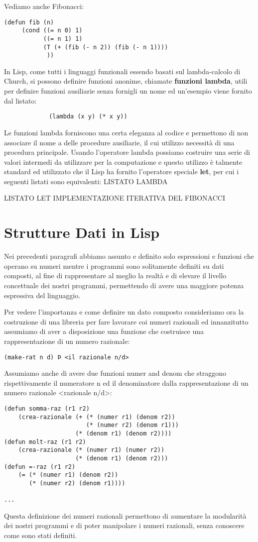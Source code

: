 \documentclass[a4paper]{book}
\begin{document}
Vediamo anche Fibonacci:
\begin{verbatim}
(defun fib (n)
     (cond ((= n 0) 1)
           ((= n 1) 1)
           (T (+ (fib (- n 2)) (fib (- n 1))))
            ))
\end{verbatim}
In Lisp, come tutti i linguaggi funzionali essendo basati sul lambda-calcolo di Church,
si possono definire funzioni anonime, chiamate \textbf{funzioni lambda}, utili per
definire funzioni ausiliarie senza fornigli un nome ed un'esempio viene fornito dal listato:
\begin{figure}
\begin{verbatim}
       (lambda (x y) (* x y))
\end{verbatim}
\end{figure}
Le funzioni lambda forniscono una certa eleganza al codice e permettono di non associare
il nome a delle procedure ausiliarie, il cui utilizzo necessità di una procedura principale.
Usando l'operatore lambda possiamo costruire una serie di valori intermedi da
utilizzare per la computazione e questo utilizzo è talmente standard ed utilizzato
che il Lisp ha fornito l'operatore speciale \textbf{let}, per cui i seguenti listati
sono equivalenti:
LISTATO LAMBDA

LISTATO LET
IMPLEMENTAZIONE ITERATIVA DEL FIBONACCI
\section{Strutture Dati in Lisp}
Nei precedenti paragrafi abbiamo assunto e definito solo espressioni e funzioni che operano su numeri mentre i programmi sono solitamente
definiti su dati composti, al fine di rappresentare al meglio la realtà e di elevare il livello concettuale dei nostri programmi, permettendo
di avere una maggiore potenza espressiva del linguaggio.

Per vedere l'importanza e come definire un dato composto consideriamo ora la costruzione di una libreria per fare lavorare coi numeri razionali
ed innanzitutto assumiamo di aver a disposizione una funzione che costruisce una rappresentazione di un numero razionale:
\begin{verbatim}
(make-rat n d) Þ <il razionale n/d>
\end{verbatim}
Assumiamo anche di avere due funzioni numer and denom che straggono rispettivamente il numeratore n ed il denominatore dalla
rappresentazione di un numero razionale <razionale n/d>:
\begin{verbatim}
(defun somma-raz (r1 r2)
    (crea-razionale (+ (* (numer r1) (denom r2))
                       (* (numer r2) (denom r1)))
                    (* (denom r1) (denom r2))))
(defun molt-raz (r1 r2)
    (crea-razionale (* (numer r1) (numer r2))
                    (* (denom r1) (denom r2)))
(defun =-raz (r1 r2)
    (= (* (numer r1) (denom r2))
       (* (numer r2) (denom r1))))

...
\end{verbatim}
Questa definizione dei numeri razionali permettono di aumentare la modularità dei nostri programmi e di poter manipolare i numeri razionali,
senza conoscere come sono stati definiti.
\end{document}
